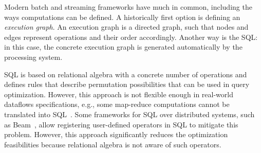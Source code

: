 Modern batch and streaming frameworks have much in common, including the ways computations can be defined. A historically first option is defining an {\em execution graph}. An execution graph is a directed graph, such that nodes and edges represent operations and their order accordingly. Another way is the SQL: in this case, the concrete execution graph is generated automatically by the processing system.  




SQL is based on relational algebra with a concrete number of operations and defines rules that describe permutation possibilities that can be used in query optimization. However, this approach is not flexible enough in real-world dataflows specifications, e.g., some map-reduce computations cannot be translated into SQL~\cite{PROOF}. Some frameworks for SQL over distributed systems, such as Beam~\cite{Begoli:2019:OSR:3299869.3314040}, allow registering user-defined operators in SQL to mitigate this problem. However, this approach significantly reduces the optimization feasibilities because relational algebra is not aware of such operators.


